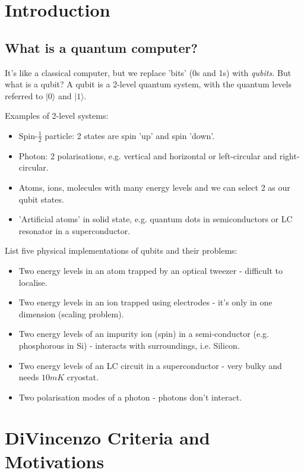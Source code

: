 \documentclass[a4paper, 11pt, normalem]{report}
\begin{document}
\chapter{Introduction}
\section{What is a quantum computer?}
It's like a classical computer, but we replace 'bits' (0s and 1s) with \emph{qubits.}
But what is a qubit?
A qubit is a 2-level quantum system, with the quantum levels referred to $|0\rangle$ and $|1\rangle$.

Examples of 2-level systems:
\begin{itemize}
    \item Spin-$\frac12$ particle: 2 states are spin 'up' and spin 'down'.
    \item Photon: 2 polarisations, e.g. vertical and horizontal or left-circular and right-circular.
    \item Atoms, ions, molecules with many energy levels and we can select 2 as our qubit states.
    \item 'Artificial atoms' in solid state, e.g. quantum dots in semiconductors or LC resonator in a superconductor.
\end{itemize}

List five physical implementations of qubits and their problems:
\begin{itemize}
    \item Two energy levels in an atom trapped by an optical tweezer - difficult to localise.
    \item Two energy levels in an ion trapped using electrodes - it's only in one dimension (scaling problem).
    \item Two energy levels of an impurity ion (spin) in a semi-conductor (e.g. phosphorous in Si) - interacts with surroundings, i.e. Silicon.
    \item Two energy levels of an LC circuit in a superconductor - very bulky and needs $10mK$ cryostat.
    \item Two polarisation modes of a photon - photons don't interact.
\end{itemize}

\chapter{DiVincenzo Criteria and Motivations}
\end{document}
